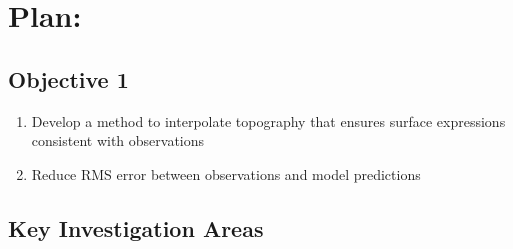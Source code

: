 \section*{Plan:}
\subsection*{Objective 1}
\begin{enumerate}
\item Develop a method to interpolate topography that ensures surface expressions consistent with observations
\item Reduce RMS error between observations and model predictions
\end{enumerate}
\subsection*{Key Investigation Areas}
